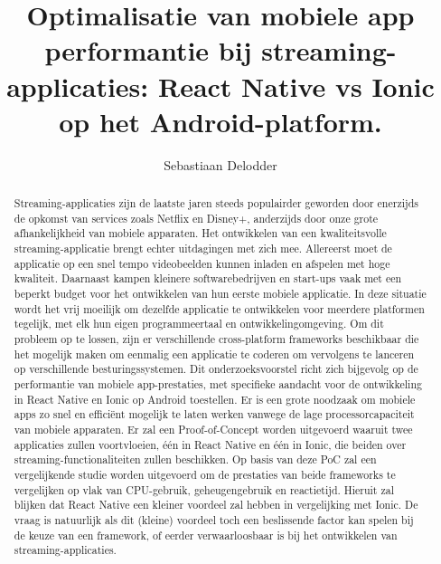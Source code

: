 \documentclass{hogent-article}
\title{Optimalisatie van mobiele app performantie bij streaming-applicaties: React Native vs Ionic op het Android-platform.}
\author{Sebastiaan Delodder}
\begin{document}
\begin{abstract}
  Streaming-applicaties zijn de laatste jaren steeds populairder geworden door enerzijds de opkomst van services zoals Netflix en Disney+, anderzijds door onze grote afhankelijkheid van mobiele apparaten. Het ontwikkelen van een kwaliteitsvolle streaming-applicatie brengt echter uitdagingen met zich mee. Allereerst moet de applicatie op een snel tempo videobeelden kunnen inladen en afspelen met hoge kwaliteit. Daarnaast kampen kleinere softwarebedrijven en start-ups vaak met een beperkt budget voor het ontwikkelen van hun eerste mobiele applicatie. In deze situatie wordt het vrij moeilijk om dezelfde applicatie te ontwikkelen voor meerdere platformen tegelijk, met elk hun eigen programmeertaal en ontwikkelingomgeving. Om dit probleem op te lossen, zijn er verschillende cross-platform frameworks beschikbaar die het mogelijk maken om eenmalig een applicatie te coderen om vervolgens te lanceren op verschillende besturingssystemen. Dit onderzoeksvoorstel richt zich bijgevolg op de performantie van mobiele app-prestaties, met specifieke aandacht voor de ontwikkeling in React Native en Ionic op Android toestellen. Er is een grote noodzaak om mobiele apps zo snel en efficiënt mogelijk te laten werken vanwege de lage processorcapaciteit van mobiele apparaten. Er zal een Proof-of-Concept worden uitgevoerd waaruit twee applicaties zullen voortvloeien, één in React Native en één in Ionic, die beiden over streaming-functionaliteiten zullen beschikken. Op basis van deze PoC zal een vergelijkende studie worden uitgevoerd om de prestaties van beide frameworks te vergelijken op vlak van CPU-gebruik, geheugengebruik en reactietijd. Hieruit zal blijken dat React Native een kleiner voordeel zal hebben in vergelijking met Ionic. De vraag is natuurlijk als dit (kleine) voordeel toch een beslissende factor kan spelen bij de keuze van een framework, of eerder verwaarloosbaar is bij het ontwikkelen van streaming-applicaties.
\end{abstract}

\tableofcontents



\printbibliography[heading=bibintoc]
\end{document}
